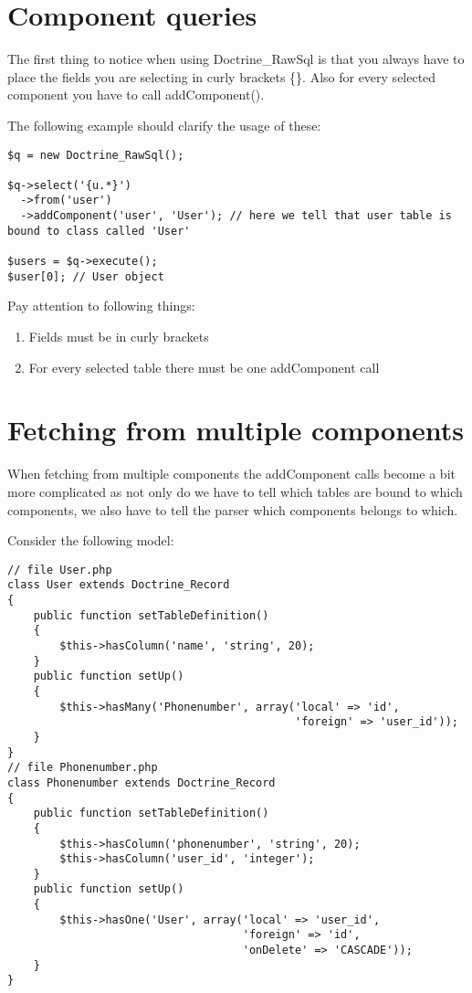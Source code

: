\documentclass[11pt,a4paper]{report}
\begin{document}
\section{Component queries}
The first thing to notice when using Doctrine\_RawSql is that you always have to place the fields you are selecting in curly brackets \{\}. Also for every selected component you have to call addComponent().

The following example should clarify the usage of these:

\begin{verbatim}
$q = new Doctrine_RawSql();

$q->select('{u.*}')
  ->from('user')
  ->addComponent('user', 'User'); // here we tell that user table is bound to class called 'User'

$users = $q->execute();
$user[0]; // User object
\end{verbatim}

Pay attention to following things:

\renewcommand{\labelenumi}{\arabic{enumi}}
\begin{enumerate}
\item{Fields must be in curly brackets}
\item{For every selected table there must be one addComponent call}
\end{enumerate}
\section{Fetching from multiple components}
When fetching from multiple components the addComponent calls become a bit more complicated as not only do we have to tell which tables are bound to which components, we also have to tell the parser which components belongs to which.

Consider the following model:

\begin{verbatim}
// file User.php
class User extends Doctrine_Record
{
    public function setTableDefinition()
    {
        $this->hasColumn('name', 'string', 20);
    }
    public function setUp()
    {
        $this->hasMany('Phonenumber', array('local' => 'id',
                                            'foreign' => 'user_id'));
    }
}
// file Phonenumber.php
class Phonenumber extends Doctrine_Record
{
    public function setTableDefinition()
    {
        $this->hasColumn('phonenumber', 'string', 20);
        $this->hasColumn('user_id', 'integer');
    }
    public function setUp()
    {
        $this->hasOne('User', array('local' => 'user_id',
                                    'foreign' => 'id',
                                    'onDelete' => 'CASCADE'));
    }
}
\end{verbatim}
\end{document}
